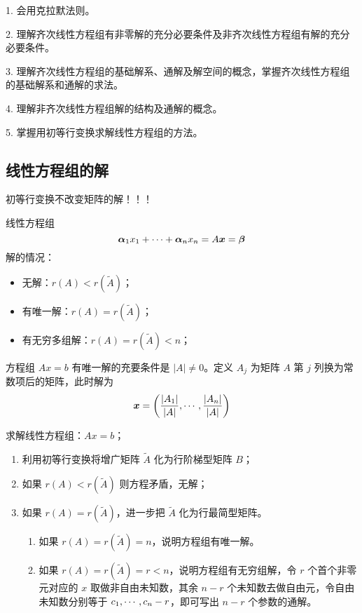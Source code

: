 1. 会用克拉默法则。

2. 理解齐次线性方程组有非零解的充分必要条件及非齐次线性方程组有解的充分必要条件。

3. 理解齐次线性方程组的基础解系、通解及解空间的概念，掌握齐次线性方程组的基础解系和通解的求法。

4. 理解非齐次线性方程组解的结构及通解的概念。

5. 掌握用初等行变换求解线性方程组的方法。

\subsection{线性方程组的解}

初等行变换不改变矩阵的解！！！

线性方程组
\[ \boldsymbol{\alpha}_1x_1 + \cdots + \boldsymbol{\alpha}_nx_n = A \boldsymbol{x} = \boldsymbol{\beta} \]
解的情况：
\begin{itemize}
	\item 无解：$r(A) < r(\widetilde{A})$；
	\item 有唯一解：$r(A) = r(\widetilde{A})$；
	\item 有无穷多组解：$r(A) = r(\widetilde{A}) < n$；
\end{itemize}


\begin{theorem}[Cramer 法则]
	方程组 $Ax = b$ 有唯一解的充要条件是 $|A| \neq 0$。定义 $A_j$ 为矩阵 $A$ 第 $j$ 列换为常数项后的矩阵，此时解为
	\[ \boldsymbol{x} = \left( \frac{|A_1|}{|A|}, \cdots, \frac{|A_n|}{|A|} \right) \]
\end{theorem}

求解线性方程组：$Ax = b$；
\begin{enumerate}
	\item 利用初等行变换将增广矩阵 $\widetilde{A}$ 化为行阶梯型矩阵 $B$；
	\item 如果 $r(A) < r(\widetilde{A})$ 则方程矛盾，无解；
	\item 如果 $r(A) = r(\widetilde{A})$，进一步把 $\widetilde{A}$ 化为行最简型矩阵。
	      \begin{enumerate}
		      \item 如果 $r(A) = r(\widetilde{A}) = n$，说明方程组有唯一解。
		      \item 如果 $r(A) = r(\widetilde{A}) = r < n$，说明方程组有无穷组解，令 $r$ 个首个非零元对应的 $x$ 取做非自由未知数，其余 $n-r$ 个未知数去做自由元，令自由未知数分别等于 $c_1,\cdots,c_n-r$，即可写出 $n-r$ 个参数的通解。
	      \end{enumerate}
\end{enumerate}

